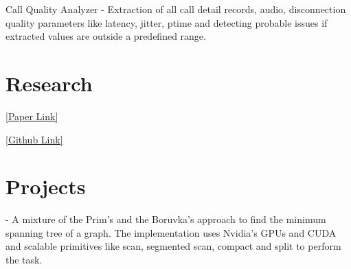 \documentclass[]{deedy-resume-openfont}
\begin{document}
\begin{minipage}[t]{0.66\textwidth}
\begin{tightemize}
\item Call Quality Analyzer - Extraction of all call detail records, audio, disconnection quality parameters like latency, jitter, ptime and detecting probable issues if extracted values are outside a predefined range.
\end{tightemize}
\sectionsep


\section{Research}
     \href{http://www.sciencedirect.com/science/article/pii/S2212017313005537}{[Paper Link]}
\sectionsep
\sectionsep

     \href{https://github.com/nabarunchatterjee/EvoComp}{[Github Link]}
\sectionsep
\sectionsep

\section{Projects}
     - A mixture of the Prim's and the Boruvka's approach to find the minimum spanning tree of a graph. The implementation uses Nvidia's GPUs and CUDA and scalable primitives like scan, segmented scan, compact and split to perform the task.
\sectionsep
\sectionsep


\end{minipage}
\end{document}
